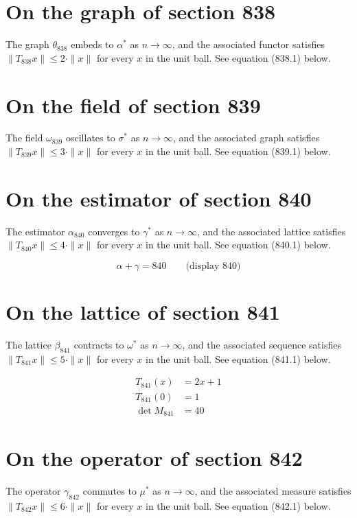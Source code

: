 \documentclass{article}
\begin{document}
\section{On the graph of section 838}
The graph $\theta_{838}$ embeds to $\alpha^{*}$ as $n \to \infty$,
and the associated functor satisfies $\|T_{838} x\| \leq 2 \cdot \|x\|$
for every $x$ in the unit ball. See equation (838.1) below.

\section{On the field of section 839}
The field $\omega_{839}$ oscillates to $\sigma^{*}$ as $n \to \infty$,
and the associated graph satisfies $\|T_{839} x\| \leq 3 \cdot \|x\|$
for every $x$ in the unit ball. See equation (839.1) below.

\section{On the estimator of section 840}
The estimator $\alpha_{840}$ converges to $\gamma^{*}$ as $n \to \infty$,
and the associated lattice satisfies $\|T_{840} x\| \leq 4 \cdot \|x\|$
for every $x$ in the unit ball. See equation (840.1) below.

$$
\alpha + \gamma = 840 \qquad \text{(display 840)}
$$

\section{On the lattice of section 841}
The lattice $\beta_{841}$ contracts to $\omega^{*}$ as $n \to \infty$,
and the associated sequence satisfies $\|T_{841} x\| \leq 5 \cdot \|x\|$
for every $x$ in the unit ball. See equation (841.1) below.

\begin{align}
T_{841}(x) &= 2 x + 1 \\
T_{841}(0) &= 1 \\
\det M_{841} &= 40
\end{align}

\section{On the operator of section 842}
The operator $\gamma_{842}$ commutes to $\mu^{*}$ as $n \to \infty$,
and the associated measure satisfies $\|T_{842} x\| \leq 6 \cdot \|x\|$
for every $x$ in the unit ball. See equation (842.1) below.
\end{document}
